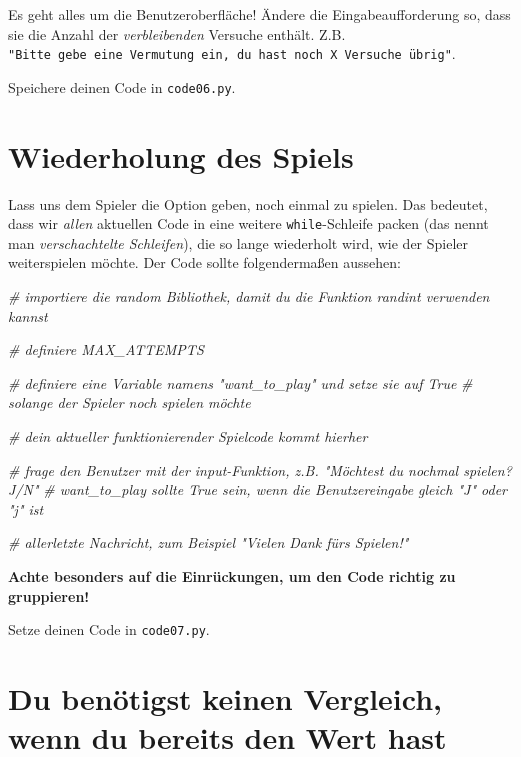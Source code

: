 \documentclass[
]{book}
\newenvironment{Shaded}{\begin{snugshade}}{\end{snugshade}}
\newcommand{\CommentTok}[1]{\textcolor[rgb]{0.56,0.35,0.01}{\textit{#1}}}
\begin{document}
Es geht alles um die Benutzeroberfläche! Ändere die Eingabeaufforderung so, dass sie die Anzahl der \emph{verbleibenden} Versuche enthält. Z.B. \texttt{"Bitte\ gebe\ eine\ Vermutung\ ein,\ du\ hast\ noch\ X\ Versuche\ übrig"}.

Speichere deinen Code in \texttt{code06.py}.

\hypertarget{guess-the-number-repeat-game}{%
\section{Wiederholung des Spiels}\label{guess-the-number-repeat-game}}

Lass uns dem Spieler die Option geben, noch einmal zu spielen. Das bedeutet, dass wir \emph{allen} aktuellen Code in eine weitere \texttt{while}-Schleife packen (das nennt man \emph{verschachtelte Schleifen}), die so lange wiederholt wird, wie der Spieler weiterspielen möchte. Der Code sollte folgendermaßen aussehen:

\begin{Shaded}
\begin{Highlighting}[]
\CommentTok{\# importiere die random Bibliothek, damit du die Funktion randint verwenden kannst}

\CommentTok{\# definiere MAX\_ATTEMPTS}

\CommentTok{\# definiere eine Variable namens "want\_to\_play" und setze sie auf True}
\CommentTok{\# solange der Spieler noch spielen möchte}
  
  \CommentTok{\# dein aktueller funktionierender Spielcode kommt hierher}
  
  \CommentTok{\# frage den Benutzer mit der input{-}Funktion, z.B. "Möchtest du nochmal spielen? J/N"}
  \CommentTok{\# want\_to\_play sollte True sein, wenn die Benutzereingabe gleich "J" oder "j" ist}
  
\CommentTok{\# allerletzte Nachricht, zum Beispiel "Vielen Dank fürs Spielen!"}
\end{Highlighting}
\end{Shaded}

\textbf{Achte besonders auf die Einrückungen, um den Code richtig zu gruppieren!}

Setze deinen Code in \texttt{code07.py}.

\hypertarget{du-benuxf6tigst-keinen-vergleich-wenn-du-bereits-den-wert-hast}{%
\section{Du benötigst keinen Vergleich, wenn du bereits den Wert hast}\label{du-benuxf6tigst-keinen-vergleich-wenn-du-bereits-den-wert-hast}}
\end{document}
